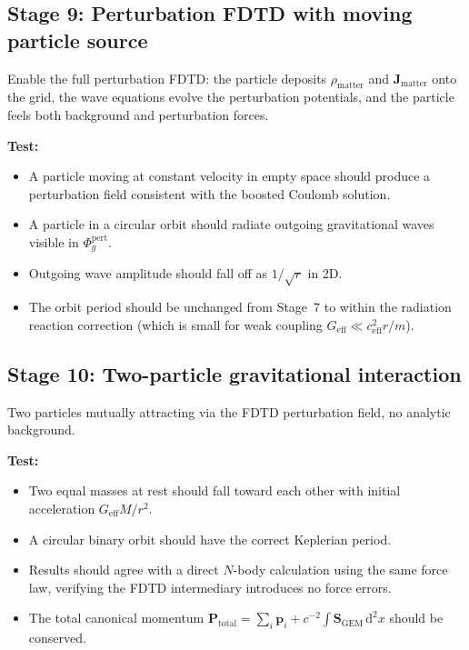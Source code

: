 \documentclass[11pt,a4paper]{article}
\newcommand{\vv}[1]{\mathbf{#1}}
\newcommand{\Phig}{\Phi_g}
\newcommand{\dd}{\mathrm{d}}
\begin{document}
\subsection{Stage 9: Perturbation FDTD with moving particle source}

Enable the full perturbation FDTD: the particle deposits $\rho_{\mathrm{matter}}$ and $\vv{J}_{\mathrm{matter}}$ onto the grid, the wave equations evolve the perturbation potentials, and the particle feels both background and perturbation forces.

\textbf{Test:}
\begin{itemize}
  \item A particle moving at constant velocity in empty space should produce a perturbation field consistent with the boosted Coulomb solution.
  \item A particle in a circular orbit should radiate outgoing gravitational waves visible in $\Phig^{\mathrm{pert}}$.
  \item Outgoing wave amplitude should fall off as $1/\sqrt{r}$ in 2D.
  \item The orbit period should be unchanged from Stage~7 to within the radiation reaction correction (which is small for weak coupling $G_{\mathrm{eff}} \ll c_{\mathrm{eff}}^2 r / m$).
\end{itemize}

\subsection{Stage 10: Two-particle gravitational interaction}

Two particles mutually attracting via the FDTD perturbation field, no analytic background.

\textbf{Test:}
\begin{itemize}
  \item Two equal masses at rest should fall toward each other with initial acceleration $G_{\mathrm{eff}}M/r^2$.
  \item A circular binary orbit should have the correct Keplerian period.
  \item Results should agree with a direct $N$-body calculation using the same force law, verifying the FDTD intermediary introduces no force errors.
  \item The total canonical momentum $\vv{P}_{\mathrm{total}} = \sum_i\vv{p}_i + c^{-2}\int\vv{S}_{\mathrm{GEM}}\,\dd^2x$ should be conserved.
\end{itemize}
\end{document}
